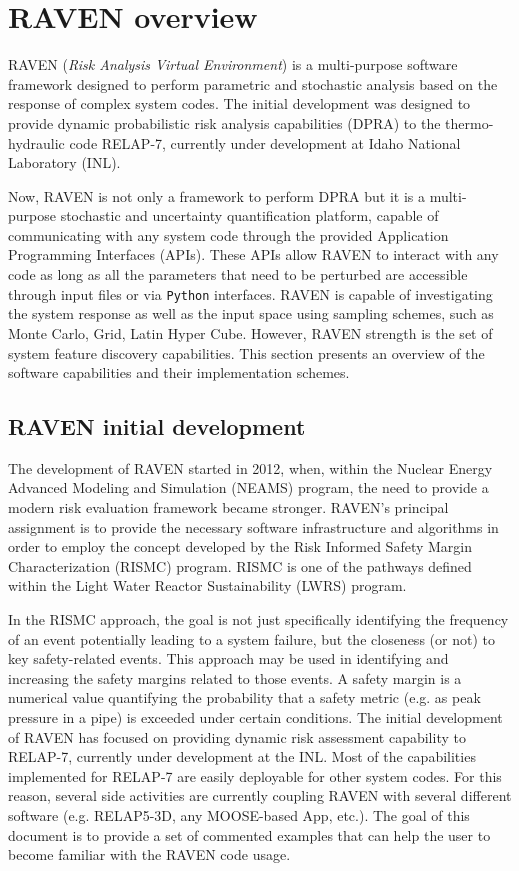 \section{RAVEN overview}
RAVEN (\textit{Risk Analysis Virtual Environment}) is a multi-purpose software framework designed to perform parametric and stochastic analysis based on the response of complex system codes. The initial development was designed to provide dynamic probabilistic risk analysis capabilities (DPRA) to the thermo-hydraulic code RELAP-7, currently under development
at Idaho National Laboratory (INL). 

Now, RAVEN is not only a framework to perform DPRA but it is a multi-purpose stochastic and uncertainty quantification platform, capable of communicating with any system code through the provided  Application Programming Interfaces (APIs). These APIs allow RAVEN to interact with any code as long as all the parameters that need to be perturbed are accessible through input files or via  \texttt{Python} interfaces. RAVEN is capable of investigating the system response as well as the input space using sampling schemes, such as Monte Carlo, Grid, Latin Hyper Cube. However, RAVEN strength is the set of system feature discovery capabilities. This section presents an overview of the software capabilities and their implementation schemes. 

\subsection{RAVEN initial development}
The development of RAVEN started in 2012, when, within the Nuclear Energy Advanced Modeling and Simulation (NEAMS) program, the need to provide a modern risk evaluation framework became stronger. RAVEN’s principal assignment is to provide the necessary software infrastructure and algorithms in order to employ the concept developed by the Risk Informed Safety Margin Characterization (RISMC) program. RISMC is one of the pathways defined within the Light Water Reactor Sustainability (LWRS) program. 

In the RISMC approach, the goal is not just specifically identifying the frequency of an event potentially leading to a system failure, but the closeness (or not) to key safety-related events. This approach may be used in identifying and increasing the safety margins related to those events. A safety margin is a numerical value quantifying the probability that a safety metric (e.g. as peak pressure in a pipe) is exceeded under certain conditions.
The initial development of RAVEN has focused on providing dynamic risk assessment capability to RELAP-7, currently under development at the INL.
Most of the capabilities implemented for RELAP-7 are easily deployable for other system codes. For this reason, several side activities  are currently coupling RAVEN with several different software (e.g.  RELAP5-3D, any MOOSE-based App, etc.).
The goal of this document is to provide a set of commented examples that can help the user to become familiar 
with the RAVEN code usage.


